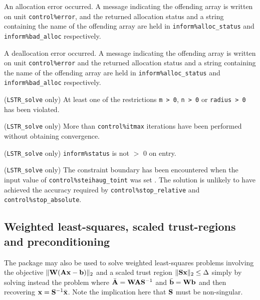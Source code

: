 \documentclass{galahad}
\newcommand{\packagename}{LS\-TR}
\begin{document}
\begin{description}
 An allocation error occurred. A message indicating 
the offending 
array is written on unit {\tt control\%error}, and the returned allocation 
status and a string containing the name of the offending array
are held in {\tt inform\%alloc\_\-status}
and {\tt inform\%bad\_alloc} respectively.

 A deallocation error occurred. 
A message indicating the offending 
array is written on unit {\tt control\%error} and the returned allocation 
status and a string containing the name of the offending array
are held in {\tt inform\%alloc\_\-status}
and {\tt inform\%bad\_alloc} respectively.

 ({\tt \packagename\_solve} only) 
At least one of the restrictions 
{\tt m > 0}, 
{\tt n > 0}
or
{\tt radius > 0}
has been violated.

 ({\tt \packagename\_solve} only) More than  
{\tt control\%itmax} iterations have been performed without obtaining 
convergence. 
 
 ({\tt \packagename\_solve} only)  {\tt inform\%status} is
not $>$ 0 on entry.
 
 ({\tt \packagename\_solve} only) 
The constraint boundary has been 
encountered when the input value of {\tt control\%steihaug\-\_\-toint} was 
set \true. The 
solution is unlikely to have achieved the accuracy required by 
{\tt control\%stop\_rela\-tive} and {\tt control\%stop\_absolute}. 
 
\end{description} 


\subsection{Weighted least-squares, scaled trust-regions and preconditioning}
The package may also be used to solve weighted least-squares problems
involving the objective $\| {\mathbf{W}}({\mathbf{A}}{\mathbf{x}}-{\mathbf{b}})\|_2$ and a scaled trust region
$\|{\mathbf{S}}{\mathbf{x}}\|_2 \leq \Delta$ simply by solving instead the problem
where $\bar{{\mathbf{A}}} = {\mathbf{W}} {\mathbf{A}} {\mathbf{S}}^{-1}$ and 
$\bar{{\mathbf{b}}} = {\mathbf{W}} {\mathbf{b}}$
and then recovering ${\mathbf{x}} = {\mathbf{S}}^{-1} \bar{{\mathbf{x}}}$. Note the implication here
that ${\mathbf{S}}$ must be non-singular.
\end{document}
